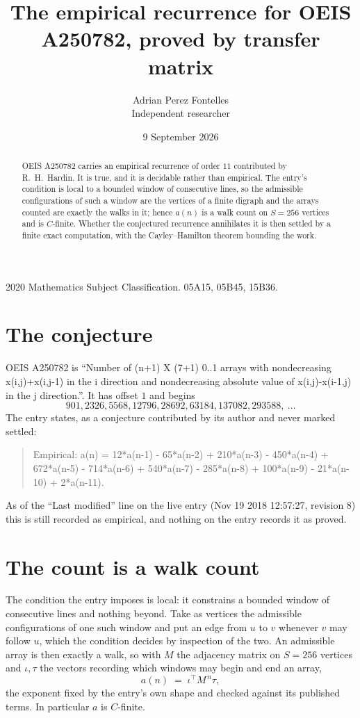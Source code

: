 \documentclass[11pt,a4paper]{article}
\title{The empirical recurrence for OEIS A250782, proved by transfer matrix}
\author{Adrian Perez Fontelles\\ \small Independent researcher}
\date{9 September 2026}
\theoremstyle{plain}
\theoremstyle{definition}
\begin{document}
\maketitle

\begin{abstract}
OEIS A250782 carries an empirical recurrence of order $11$ contributed by R.~H.~Hardin. It is
true, and it is decidable rather than empirical. The entry's condition is local to a bounded window of consecutive lines, so
the admissible configurations of such a window are the vertices of a finite digraph and the
arrays counted are exactly the walks in it; hence $a(n)$ is a walk count on $S=256$ vertices
and is $C$-finite. Whether the conjectured recurrence annihilates it is then settled by a
finite exact computation, with the Cayley--Hamilton theorem bounding the work.
\end{abstract}

\noindent\small 2020 Mathematics Subject Classification. 05A15, 05B45, 15B36.\normalsize

\section{The conjecture}

OEIS A250782 is ``Number of (n+1) X (7+1) 0..1 arrays with nondecreasing x(i,j)+x(i,j-1) in the i direction and nondecreasing absolute value of x(i,j)-x(i-1,j) in the j direction.''. It has offset $1$ and begins
\[
901, 2326, 5568, 12796, 28692, 63184, 137082, 293588,\ \dots
\]
The entry states, as a conjecture contributed by its author and never marked settled:
\begin{quote}
Empirical: a(n) = 12*a(n-1) - 65*a(n-2) + 210*a(n-3) - 450*a(n-4) + 672*a(n-5) - 714*a(n-6) + 540*a(n-7) - 285*a(n-8) + 100*a(n-9) - 21*a(n-10) + 2*a(n-11).
\end{quote}
As of the ``Last modified'' line on the live entry (Nov 19 2018 12:57:27, revision 8) this is still
recorded as empirical, and nothing on the entry records it as proved.

\section{The count is a walk count}

The condition the entry imposes is local: it constrains a bounded window of consecutive lines and nothing beyond. Take as
vertices the admissible configurations of one such window and put an edge from $u$ to $v$
whenever $v$ may follow $u$, which the condition decides by inspection of the two. An
admissible array is then exactly a walk, so with $M$ the adjacency matrix on $S=256$ vertices
and $\iota,\tau$ the vectors recording which windows may begin and end an array,
\[
a(n)\;=\;\iota^{\!\top}M^{\,n}\tau ,
\]
the exponent fixed by the entry's own shape and checked against its published terms. In
particular $a$ is $C$-finite.
\end{document}
